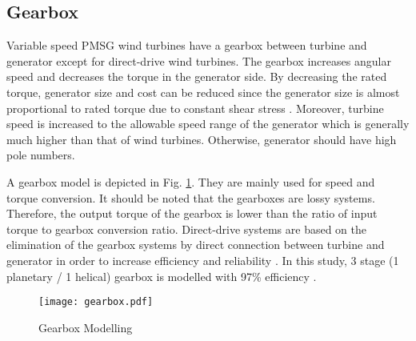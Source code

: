 \subsection{Gearbox}  
Variable speed PMSG wind turbines have a gearbox between turbine and generator except for direct-drive wind turbines. The gearbox increases angular speed and decreases the torque in the generator side. By decreasing the rated torque, generator size and cost can be reduced since the generator size is almost proportional to rated torque due to constant shear stress \cite{Polinder2013aa}. Moreover, turbine speed is increased to the allowable speed range of the generator which is generally much higher than that of wind turbines. Otherwise, generator should have high pole numbers. \par
A gearbox model is depicted in Fig. \ref{gearboxmodel}. They are mainly used for speed and torque conversion. It should be noted that the gearboxes are lossy systems. Therefore, the output torque of the gearbox is lower than the ratio of input torque to gearbox conversion ratio. Direct-drive systems are based on the elimination of the gearbox systems by direct connection between turbine and generator in order to increase efficiency and reliability \cite{Chen2009b}. In this study, 3 stage (1 planetary / 1 helical) gearbox is modelled with 97\% efficiency \cite{UKONSAARI2016}. 
\begin{figure}[h!]
	\centering
	\texttt{[image: gearbox.pdf]}
	\caption{Gearbox Modelling}
	\label{gearboxmodel}
\end{figure}
